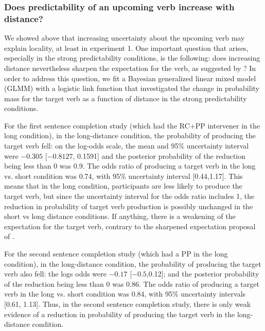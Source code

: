 \documentclass{frontiersSCNS}\usepackage{knitr} %
\begin{document}
\subsubsection{Does predictability of an upcoming verb increase with distance?}

We showed above that increasing uncertainty about the upcoming verb may explain locality, at least in experiment 1. One important question that arises, especially in the strong predictability conditions, is the following: does increasing distance nevertheless sharpen the expectation for the verb, as suggested by  \citet{konieczny2000locality}? In order to address this question, 
we fit a Bayesian generalized linear mixed model (GLMM) with a logistic link function that investigated the change in probability mass for the target verb as a function of distance in the strong predictability conditions. 



For the first sentence completion study (which had the RC+PP intervener in the long condition), in the long-distance condition, the probability of producing the target verb fell: on the log-odds scale, the mean and 95\% uncertainty interval were
\ensuremath{-0.305}
[\ensuremath{-0.8127},
0.1591]
and the posterior probability of the reduction being less than 0  was
0.9.
The odds ratio of producing a target verb in the long vs. short condition was 
0.74,
with 95\% uncertainty interval
[0.44,1.17].
This means that in the long condition, participants are less likely to 
produce the target verb, but since the uncertainty interval for the odds ratio 
includes 1, the reduction in probability of target verb production is possibly unchanged in the short vs long distance conditions. If anything, there is a weakening of the expectation for the target verb, contrary to the sharpened expectation proposal 
of \citet{konieczny2000locality}.



For the second sentence completion study (which had a PP in the long condition), 
in the long-distance condition, the probability of producing the target verb also fell: the logs odds were
\ensuremath{-0.17}
[\ensuremath{-0.5},0.12];
and 
the posterior probability of the reduction being less than 0 was 
0.86.
The odds ratio of producing a target verb in the long vs. short condition was 
0.84,
with 95\% uncertainty intervals 
[0.61,
1.13].
Thus, in the second sentence completion study, there is only weak evidence of a reduction in probability of producing the target verb in the long-distance condition.  
\end{document}
